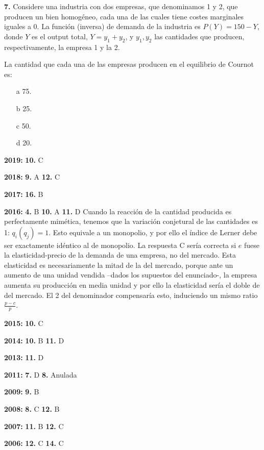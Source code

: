 \documentclass{nuevotema}
\begin{document}
\textbf{7.} Considere una industria con dos empresas, que denominamos 1 y 2, que producen un bien homogéneo, cada una de las cuales tiene costes marginales iguales a 0. La función (inversa) de demanda de la industria es $P(Y) = 150 - Y$, donde $Y$ es el output total, $Y = y_1 + y_2$, y $y_1, y_2$ las cantidades que producen, respectivamente, la empresa 1 y la 2.

La cantidad que cada una de las empresas producen en el equilibrio de Cournot es:

\begin{enumerate}
	\item[a] 75.
	\item[b] 25.
	\item[c] 50.
	\item[d] 20.
\end{enumerate}

\notas

\textbf{2019:} \textbf{10.} C

\textbf{2018:} \textbf{9.} A \textbf{12.} C

\textbf{2017:} \textbf{16.} B

\textbf{2016:} \textbf{4.} B \textbf{10.} A \textbf{11.} D Cuando la reacción de la cantidad producida es perfectamente mimética, tenemos que la variación conjetural de las cantidades es 1: $q_i(q_j)=1$. Esto equivale a un monopolio, y por ello el índice de Lerner debe ser exactamente idéntico al de monopolio. La respuesta C sería correcta si $e$ fuese la elasticidad-precio de la demanda de una empresa, no del mercado. Esta elasticidad es necesariamente la mitad de la del mercado, porque ante un aumento de una unidad vendida --dados los supuestos del enunciado-, la empresa aumenta su producción en media unidad y por ello la elasticidad sería el doble de del mercado. El 2 del denominador compensaría esto, induciendo un mismo ratio $\frac{p-c}{p}$.

\textbf{2015:} \textbf{10.} C

\textbf{2014:} \textbf{10.} B \textbf{11.} D

\textbf{2013:} \textbf{11.} D %

\textbf{2011:} \textbf{7.} D \textbf{8.} Anulada

\textbf{2009:} \textbf{9.} B

\textbf{2008:} \textbf{8.} C \textbf{12.} B

\textbf{2007:} \textbf{11.} B \textbf{12.} C

\textbf{2006:} \textbf{12.} C \textbf{14.} C
\end{document}
